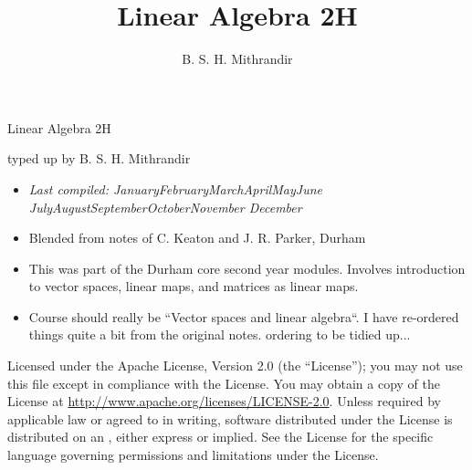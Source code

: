 \documentclass[letter-paper]{tufte-book}
\title{Linear Algebra 2H}
\author[]{B. S. H. Mithrandir}
\newcommand{\monthyear}{%
  \ifcase\month\or January\or February\or March\or April\or May\or June\or
  July\or August\or September\or October\or November\or
  December\fi\space\number\year
}
\begin{document}



\chapter*{}

\begin{fullwidth}

\par \begin{center}{\Huge Linear Algebra 2H}\end{center}

\vspace*{5mm}

\par \begin{center}{\Large typed up by B. S. H. Mithrandir}\end{center}

\vspace*{5mm}

\begin{itemize}
  \item \textit{Last compiled: \monthyear}
  \item Blended from notes of C. Keaton and J. R. Parker, Durham
  \item This was part of the Durham core second year modules. Involves introduction to vector spaces, linear maps, and matrices as linear maps.
  \item Course should really be ``Vector spaces and linear algebra``. I have re-ordered things quite a bit from the original notes. {\color{red}ordering to be tidied up...}
\end{itemize}

\par

\par Licensed under the Apache License, Version 2.0 (the ``License''); you may not use this file except in compliance with the License. You may obtain a copy of the License at \url{http://www.apache.org/licenses/LICENSE-2.0}. Unless required by applicable law or agreed to in writing, software distributed under the License is distributed on an , either express or implied. See the License for the specific language governing permissions and limitations under the License.
\end{fullwidth}
\end{document}
